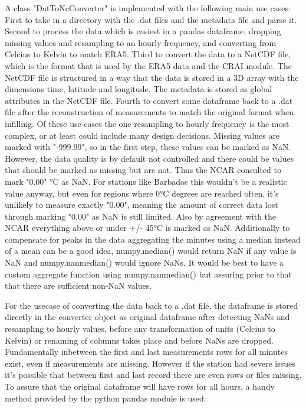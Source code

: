 A class "DatToNcConverter" is implemented with the following main use cases:
First to take in a directory with the .dat files and the metadata file and parse it. Second to process the data which is easiest in a pandas dataframe, dropping missing values and resampling to an hourly frequency, and converting from Celcius to Kelvin to match ERA5. Third to convert the data to a NetCDF file, which is the format that is used by the ERA5 data and the CRAI module. The NetCDF file is structured in a way that the data is stored in a 3D array with the dimensions time, latitude and longitude. The metadata is stored as global attributes in the NetCDF file. Fourth to convert some dataframe back to a .dat file after the reconstruction of measurements to match the original format when infilling. Of these use cases the one resampling to hourly frequency is the most complex, or at least could include many design decisions. Missing values are marked with "-999.99", so in the first step, these values can be marked as NaN. However, the data quality is by default not controlled and there could be values that should be marked as missing but are not. Thus the NCAR consulted to mark "0.00" °C as NaN. For stations like Barbados this wouldn't be a realistic value anyway, but even for regions where 0°C degrees are reached often, it's unlikely to measure exactly "0.00", meaning the amount of correct data lost through marking "0.00" as NaN is still limited. Also by agreement with the NCAR everything above or under +/- 45°C is marked as NaN. Additionally to compensate for peaks in the data aggregating the minutes using a median instead of a mean can be a good idea, numpy.median() would return NaN if any value is NaN and numpy.nanmedian() would ignore NaNs. It would be best to have a custom aggregate function using numpy.nanmedian() but assuring prior to that that there are sufficient non-NaN values.

For the usecase of converting the data back to a .dat file, the dataframe is stored directly in the converter object as original dataframe after detecting NaNs and resampling to hourly values, before any transformation of units (Celcius to Kelvin) or renaming of columns takes place and before NaNs are dropped. Fundamentally inbetween the first and last measurements rows for all minutes exist, even if measurements are missing. However if the station had severe issues it's possible that between first and last record there are even rows or files missing. To assure that the original dataframe will have rows for all hours, a handy method provided by the python pandas module is used:

